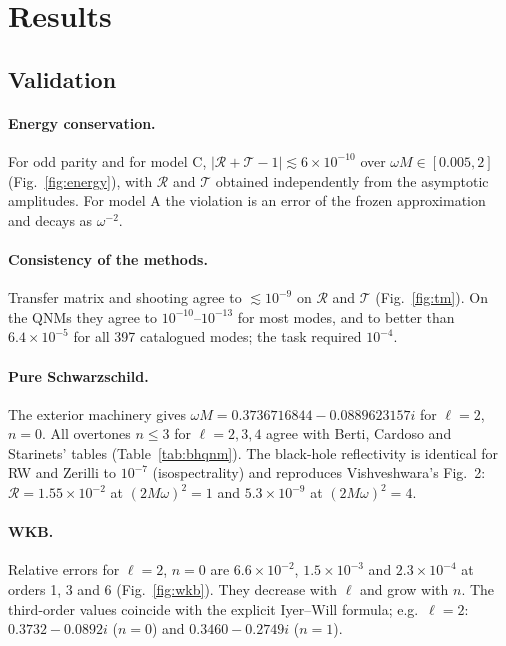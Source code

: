 \documentclass[11pt,a4paper]{article}
\numberwithin{equation}{section}
\newcommand{\RR}{\mathcal R}
\newcommand{\TT}{\mathcal T}
\begin{document}
\section{Results}\label{sec:results}
\subsection{Validation}
\begin{table}[h]\centering\small
\caption{Validation summary of the first round (M1/M2: transfer-matrix and shooting methods; $|\Delta_{12}|$: maximum
difference over $\omega M\in[0.005,2]$).}\label{tab:valid}
\resizebox{\textwidth}{!}{}
\end{table}
\paragraph{Energy conservation.} For odd parity and for model C, $|\RR+\TT-1|\lesssim6\times10^{-10}$ over
$\omega M\in[0.005,2]$ (Fig.~\ref{fig:energy}), with $\RR$ and $\TT$ obtained independently from the asymptotic
amplitudes. For model A the violation is an error of the frozen approximation and decays as $\omega^{-2}$.
\paragraph{Consistency of the methods.} Transfer matrix and shooting agree to $\lesssim10^{-9}$ on $\RR$ and $\TT$
(Fig.~\ref{fig:tm}). On the QNMs they agree to $10^{-10}$--$10^{-13}$ for most modes, and to better than
$6.4\times10^{-5}$ for all 397 catalogued modes; the task required $10^{-4}$.
\paragraph{Pure Schwarzschild.} The exterior machinery gives $\omega M=0.3736716844-0.0889623157i$ for $\ell=2$,
$n=0$. All overtones $n\le3$ for $\ell=2,3,4$ agree with Berti, Cardoso and Starinets' tables \cite{BCS09}
(Table~\ref{tab:bhqnm}). The black-hole reflectivity is identical for RW and Zerilli to $10^{-7}$ (isospectrality) and
reproduces Vishveshwara's Fig.~2: $\RR=1.55\times10^{-2}$ at $(2M\omega)^2=1$ and $5.3\times10^{-9}$ at $(2M\omega)^2=4$.
\paragraph{WKB.} Relative errors for $\ell=2$, $n=0$ are $6.6\times10^{-2}$, $1.5\times10^{-3}$ and $2.3\times10^{-4}$ at
orders 1, 3 and 6 (Fig.~\ref{fig:wkb}). They decrease with $\ell$ and grow with $n$. The third-order values coincide
with the explicit Iyer--Will formula; e.g.\ $\ell=2$: $0.3732-0.0892i$ ($n=0$) and $0.3460-0.2749i$ ($n=1$).
\end{document}
